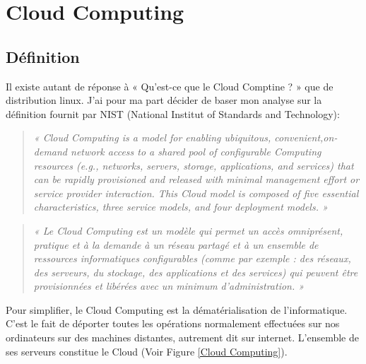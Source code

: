 \chapter{Cloud Computing} \label{CloudComputingAnnexe}

  \section{Définition}
  Il existe autant de réponse à « Qu’est-ce que le Cloud Comptine ? » que de distribution linux. J’ai pour ma part décider de baser mon analyse sur la définition fournit par NIST (National Institut of Standards and Technology):\\

  \begin{quotation}
    \emph{« Cloud Computing is a model for enabling ubiquitous, convenient,on-demand network access to a shared pool of configurable Computing resources (e.g., networks, servers, storage, applications, and services) that can be rapidly provisioned and released with minimal management effort or service provider interaction. This Cloud model is composed of five essential characteristics, three service models, and four deployment models. »}
  \end{quotation}

  \begin{quotation}
    \emph{« Le Cloud Computing est un modèle qui permet un accès omniprésent, pratique et à la demande à un réseau partagé et à un ensemble de ressources informatiques configurables (comme par exemple : des réseaux, des serveurs, du stockage, des applications et des services) qui peuvent être provisionnées et libérées avec un minimum d’administration. »}\\
  \end{quotation}

  Pour simplifier, le Cloud Computing est la dématérialisation de l’informatique. C’est le fait de déporter toutes les opérations normalement effectuées sur nos ordinateurs sur des machines distantes, autrement dit sur internet. L’ensemble de ses serveurs constitue le Cloud (Voir Figure \ref{Cloud Computing}).

